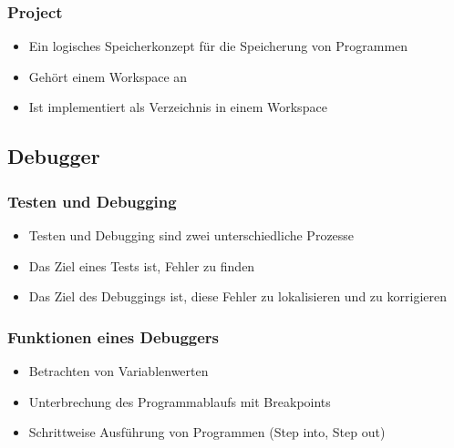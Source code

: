 \subsubsection{Project}
\label{sec:Project}
\begin{itemize}
	\item Ein logisches Speicherkonzept für die Speicherung von Programmen
	\item Gehört einem Workspace an
	\item Ist implementiert als Verzeichnis in einem Workspace
\end{itemize}


\subsection{Debugger}
\label{sec:Debugger}

\subsubsection{Testen und Debugging}
\label{sec:Testen und Debugging}
\begin{itemize}
	\item Testen und Debugging sind zwei unterschiedliche Prozesse
	\item Das Ziel eines Tests ist, Fehler zu finden
	\item Das Ziel des Debuggings ist, diese Fehler zu lokalisieren und zu korrigieren
\end{itemize}

\subsubsection{Funktionen eines Debuggers}
\label{Fukntionen eines Debuggers}
\begin{itemize}
	\item Betrachten von Variablenwerten
	\item Unterbrechung des Programmablaufs mit Breakpoints
	\item Schrittweise Ausführung von Programmen (Step into, Step out)
\end{itemize}


